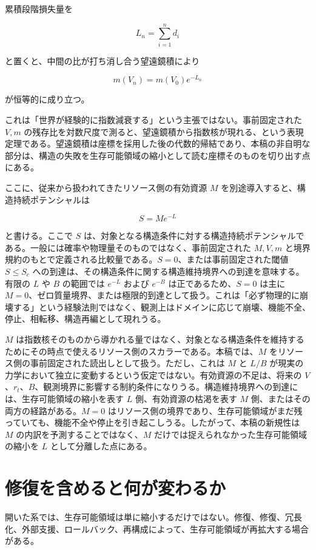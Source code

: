 \documentclass[12pt,a4paper]{article}
\begin{document}
累積段階損失量を

\[
L_{n}=\sum_{i=1}^{n} d_{i}
\]

と置くと、中間の比が打ち消し合う望遠鏡積により

\[
m(V_{n})=m(V_0)e^{-L_{n}}
\]

が恒等的に成り立つ。

これは「世界が経験的に指数減衰する」という主張ではない。事前固定された \(V,m\) の残存比を対数尺度で測ると、望遠鏡積から指数核が現れる、という表現定理である。望遠鏡積は座標を採用した後の代数的帰結であり、本稿の非自明な部分は、構造の失敗を生存可能領域の縮小として読む座標そのものを切り出す点にある。

ここに、従来から扱われてきたリソース側の有効資源 \(M\) を別途導入すると、構造持続ポテンシャルは

\[
S=Me^{-L}
\]

と書ける。ここで \(S\) は、対象となる構造条件に対する構造持続ポテンシャルである。一般には確率や物理量そのものではなく、事前固定された \(M,V,m\) と境界規約のもとで定義される比較量である。\(S=0\)、または事前固定された閾値 \(S\le S_{c}\) への到達は、その構造条件に関する構造維持境界への到達を意味する。有限の \(L\) や \(B\) の範囲では \(e^{-L}\) および \(e^{-B}\) は正であるため、\(S=0\) は主に \(M=0\)、ゼロ質量境界、または極限的到達として扱う。これは「必ず物理的に崩壊する」という経験法則ではなく、観測上はドメインに応じて崩壊、機能不全、停止、相転移、構造再編として現れうる。

\(M\) は指数核そのものから導かれる量ではなく、対象となる構造条件を維持するためにその時点で使えるリソース側のスカラーである。本稿では、\(M\) をリソース側の事前固定された読出しとして扱う。ただし、これは \(M\) と \(L/B\) が現実の力学において独立に変動するという仮定ではない。有効資源の不足は、将来の \(V\)、\(r_{t}\)、\(B\)、観測境界に影響する制約条件になりうる。構造維持境界への到達には、生存可能領域の縮小を表す \(L\) 側、有効資源の枯渇を表す \(M\) 側、またはその両方の経路がある。\(M=0\) はリソース側の境界であり、生存可能領域がまだ残っていても、機能不全や停止を引き起こしうる。したがって、本稿の新規性は \(M\) の内訳を予測することではなく、\(M\) だけでは捉えられなかった生存可能領域の縮小を \(L\) として分離した点にある。

\section{修復を含めると何が変わるか}\label{ux4feeux5fa9ux3092ux542bux3081ux308bux3068ux4f55ux304cux5909ux308fux308bux304b}

開いた系では、生存可能領域は単に縮小するだけではない。修復、修復、冗長化、外部支援、ロールバック、再構成によって、生存可能領域が再拡大する場合がある。
\end{document}
